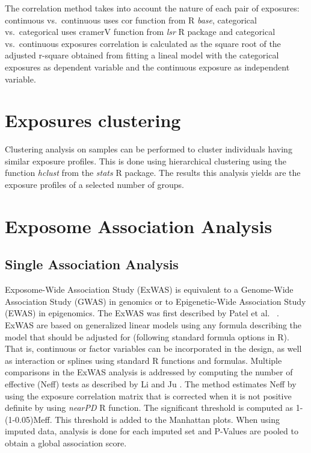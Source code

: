 \documentclass[
]{book}
\begin{document}
The correlation method takes into account the nature of each pair of exposures: continuous vs.~continuous uses cor function from R \emph{base}, categorical vs.~categorical uses cramerV function from \emph{lsr} R package and categorical vs.~continuous exposures correlation is calculated as the square root of the adjusted r-square obtained from fitting a lineal model with the categorical exposures as dependent variable and the continuous exposure as independent variable.

\hypertarget{exposures-clustering}{%
\section{Exposures clustering}\label{exposures-clustering}}

Clustering analysis on samples can be performed to cluster individuals having similar exposure profiles. This is done using hierarchical clustering using the function \emph{hclust} from the \emph{stats} R package. The results this analysis yields are the exposure profiles of a selected number of groups.

\hypertarget{exposome-association-analysis}{%
\section{Exposome Association Analysis}\label{exposome-association-analysis}}

\hypertarget{single-association-analysis}{%
\subsection{Single Association Analysis}\label{single-association-analysis}}

Exposome-Wide Association Study (ExWAS) is equivalent to a Genome-Wide Association Study (GWAS) in genomics or to Epigenetic-Wide Association Study (EWAS) in epigenomics. The ExWAS was first described by Patel et al.~\citet{patel2010environment} . ExWAS are based on generalized linear models using any formula describing the model that should be adjusted for (following standard formula options in R). That is, continuous or factor variables can be incorporated in the design, as well as interaction or splines using standard R functions and formulas. Multiple comparisons in the ExWAS analysis is addressed by computing the number of effective (Neff) tests as described by Li and Ju \citet{li2005adjusting} . The method estimates Neff by using the exposure correlation matrix that is corrected when it is not positive definite by using \emph{nearPD} R function. The significant threshold is computed as 1-(1-0.05)Meff. This threshold is added to the Manhattan plots. When using imputed data, analysis is done for each imputed set and P-Values are pooled to obtain a global association score.
\end{document}
